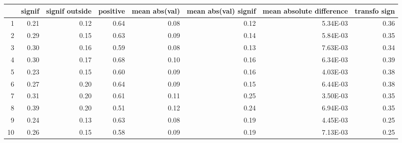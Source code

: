 \begin{table}[ht]
\centering
\begin{tabular}{rrrrrrrr}
  \hline
 & signif & signif outside & positive & mean abs(val) & mean abs(val) signif & mean absolute difference & transfo sign \\ 
  \hline
1 & 0.21 & 0.12 & 0.64 & 0.08 & 0.12 & 5.34E-03 & 0.36 \\ 
  2 & 0.29 & 0.15 & 0.63 & 0.09 & 0.14 & 5.84E-03 & 0.35 \\ 
  3 & 0.30 & 0.16 & 0.59 & 0.08 & 0.13 & 7.63E-03 & 0.34 \\ 
  4 & 0.30 & 0.17 & 0.68 & 0.10 & 0.16 & 6.34E-03 & 0.39 \\ 
  5 & 0.23 & 0.15 & 0.60 & 0.09 & 0.16 & 4.03E-03 & 0.38 \\ 
  6 & 0.27 & 0.20 & 0.64 & 0.09 & 0.15 & 6.44E-03 & 0.38 \\ 
  7 & 0.31 & 0.20 & 0.61 & 0.11 & 0.25 & 3.50E-03 & 0.35 \\ 
  8 & 0.39 & 0.20 & 0.51 & 0.12 & 0.24 & 6.94E-03 & 0.35 \\ 
  9 & 0.24 & 0.13 & 0.63 & 0.08 & 0.19 & 4.45E-03 & 0.25 \\ 
  10 & 0.26 & 0.15 & 0.58 & 0.09 & 0.19 & 7.13E-03 & 0.25 \\ 
   \hline
\end{tabular}
\end{table}
